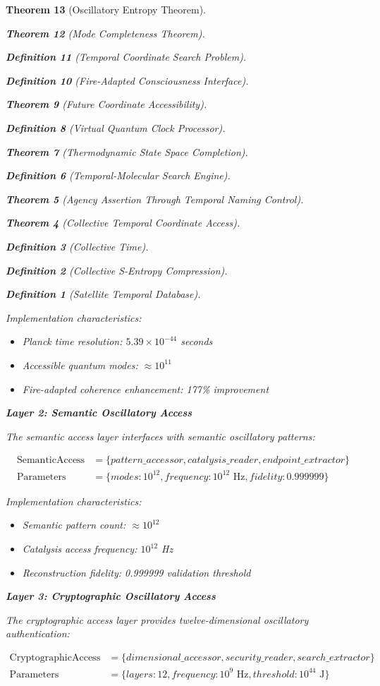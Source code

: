 \documentclass[12pt,a4paper]{article}
\newtheorem{theorem}{Theorem}[section]
\newtheorem{definition}[theorem]{Definition}
\begin{document}
\begin{theorem}[Oscillatory Entropy Theorem]
\begin{theorem}[Mode Completeness Theorem]
\begin{enumerate}
\begin{definition}[Temporal Coordinate Search Problem]
\begin{algorithm}
\begin{definition}[Fire-Adapted Consciousness Interface]
\begin{theorem}[Future Coordinate Accessibility]
\begin{definition}[Virtual Quantum Clock Processor]
\begin{itemize}
\begin{itemize}
\begin{theorem}[Thermodynamic State Space Completion]
\begin{definition}[Temporal-Molecular Search Engine]
\begin{theorem}[Agency Assertion Through Temporal Naming Control]
\begin{remark}
\begin{theorem}[Collective Temporal Coordinate Access]
\begin{definition}[Collective Time]
\begin{definition}[Collective S-Entropy Compression]
\begin{definition}[Satellite Temporal Database]
\begin{algorithm}
\begin{table}[h]
{{Implementation characteristics:
\begin{itemize}
\item Planck time resolution: $5.39 \times 10^{-44}$ seconds
\item Accessible quantum modes: $\approx 10^{11}$
\item Fire-adapted coherence enhancement: 177\% improvement
\end{itemize}

\textbf{Layer 2: Semantic Oscillatory Access}

The semantic access layer interfaces with semantic oscillatory patterns:

\begin{align}
\text{SemanticAccess} &= \{pattern\_accessor, catalysis\_reader, endpoint\_extractor\} \\
\text{Parameters} &= \{modes: 10^{12}, frequency: 10^{12} \text{ Hz}, fidelity: 0.999999\}
\end{align}

Implementation characteristics:
\begin{itemize}
\item Semantic pattern count: $\approx 10^{12}$
\item Catalysis access frequency: $10^{12}$ Hz
\item Reconstruction fidelity: 0.999999 validation threshold
\end{itemize}

\textbf{Layer 3: Cryptographic Oscillatory Access}

The cryptographic access layer provides twelve-dimensional oscillatory authentication:

\begin{align}
\text{CryptographicAccess} &= \{dimensional\_accessor, security\_reader, search\_extractor\} \\
\text{Parameters} &= \{layers: 12, frequency: 10^9 \text{ Hz}, threshold: 10^{44} \text{ J}\}
\end{align}

}}
\end{table}
\end{algorithm}
\end{definition}
\end{definition}
\end{definition}
\end{theorem}
\end{remark}
\end{theorem}
\end{definition}
\end{theorem}
\end{itemize}
\end{itemize}
\end{definition}
\end{theorem}
\end{definition}
\end{algorithm}
\end{definition}
\end{enumerate}
\end{theorem}
\end{theorem}
\end{document}
